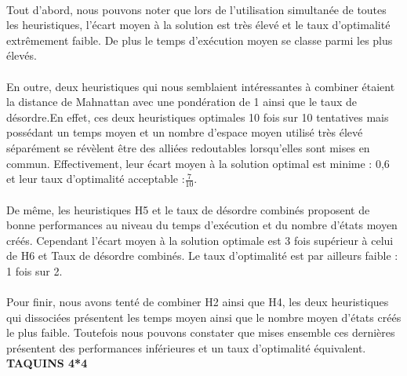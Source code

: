 \documentclass[10pt,a4paper]{report}
\begin{document}
\paragraph{}{Tout d'abord, nous pouvons noter que lors de l'utilisation simultanée de toutes les heuristiques, l'écart moyen à la solution est très élevé et le taux d'optimalité extrêmement faible. De plus le temps d'exécution moyen se classe parmi les plus élevés.}
\paragraph{}{En outre, deux heuristiques qui nous semblaient intéressantes à combiner étaient la distance de Mahnattan avec une pondération de 1 ainsi que le taux de désordre.En effet, ces deux heuristiques optimales 10 fois sur 10 tentatives mais possédant un temps moyen et un nombre d'espace moyen utilisé très élevé séparément  se révèlent être des alliées redoutables lorsqu'elles sont mises en commun. Effectivement, leur écart moyen à la solution optimal est minime : 0,6 et leur taux d'optimalité acceptable :$\frac{7}{10}$. }

\paragraph{}{De même, les heuristiques H5 et le taux de désordre combinés proposent de bonne performances au niveau du temps d'exécution et du nombre d'états moyen créés. Cependant l'écart moyen à la solution optimale est 3 fois supérieur à celui de H6 et Taux de désordre combinés. Le taux d'optimalité est par ailleurs faible : 1 fois sur 2.}

\paragraph{}{Pour finir, nous avons tenté de combiner H2 ainsi que H4, les deux heuristiques qui dissociées présentent les temps moyen ainsi que le nombre moyen d'états créés le plus faible.  Toutefois nous pouvons constater que mises ensemble ces dernières présentent des performances inférieures et un taux d'optimalité équivalent. }
\textbf{TAQUINS 4*4}
\end{document}
